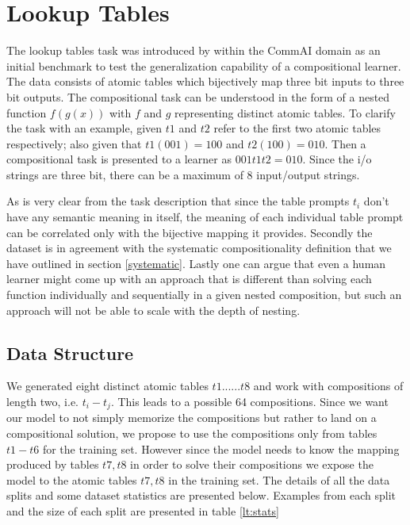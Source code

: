 \section{Lookup Tables} \label{datasets:lt}
The lookup tables task was introduced by \cite{Liska2018} within the CommAI domain \citep{Baroni2017} as an initial benchmark to test the generalization capability of a compositional learner. The data consists of atomic tables which bijectively map three bit inputs to three bit outputs. The compositional task can be understood in the form of a nested function $f(g(x))$ with $f$ and $g$ representing distinct atomic tables. To clarify the task with an example, given $t1$ and $t2$ refer to the first two atomic tables respectively; also given that $t1(001) = 100$ and $t2(100) = 010$. Then a compositional task is presented to a learner as $001 t1 t2 = 010$. Since the i/o strings are three bit, there can be a maximum of 8 input/output strings.

As is very clear from the task description that since the table prompts $t_i$ don't have any semantic meaning in itself, the meaning of each individual table prompt can be correlated only with the bijective mapping it provides. Secondly the dataset is in agreement with the systematic compositionality definition that we have outlined in section \ref{systematic}. Lastly one can argue that even a human learner might come up with an approach that is different than solving each function individually and sequentially in a given nested composition, but such an approach will not be able to scale with the depth of nesting.

\subsection{Data Structure}\label{lt:splits}
We generated eight distinct atomic tables $t1......t8$ and work with compositions of length two, i.e. $t_i - t_j$. This leads to a possible 64 compositions. Since we want our model to not simply memorize the compositions but rather to land on a compositional solution, we propose to use the compositions only from tables $t1 - t6$ for the training set. However since the model needs to know the mapping produced by tables $t7, t8$ in order to solve their compositions we expose the model to the atomic tables $t7, t8$ in the training set. The details of all the data splits and some dataset statistics are presented below. Examples from each split and the size of each split are presented in table \ref{lt:stats}

